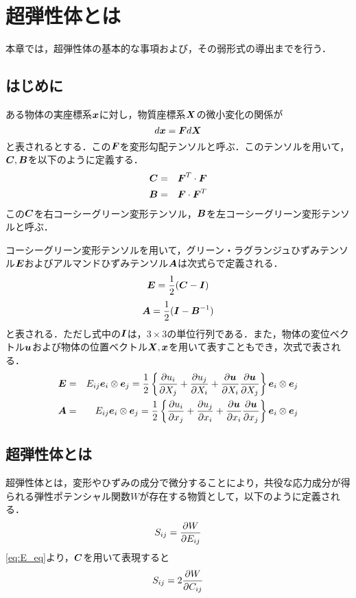 \section{超弾性体とは}
本章では，超弾性体の基本的な事項および，その弱形式の導出までを行う．
\subsection{はじめに}
ある物体の実座標系$ \bd{x} $に対し，物質座標系$ \bd{X} $の微小変化の関係が
\begin{equation}\label{eq:FloryTensor}
	d\bd{x} = \bd{F}d\bd{X}
\end{equation}
と表されるとする．この$ \bd{F} $を変形勾配テンソルと呼ぶ．このテンソルを用いて，$ \bd{C},\bd{B} $を以下のように定義する．
\begin{eqnarray}\label{eq:CandB_Define}
	\bd{C} &=& \bd{F}^T \cdot \bd{F} \\
	\bd{B} &=& \bd{F} \cdot \bd{F}^T
\end{eqnarray}
この$ \bd{C} $を右コーシーグリーン変形テンソル，$ \bd{B} $を左コーシーグリーン変形テンソルと呼ぶ．

コーシーグリーン変形テンソルを用いて，グリーン・ラグランジュひずみテンソル$ \bd{E} $およびアルマンドひずみテンソル$ \bd{A} $は次式らで定義される．
\begin{equation}\label{eq:E_eq}
	\bd{E}=\frac{1}{2} (\bd{C}-\bd{I})
\end{equation}
\begin{equation}\label{eq:Aeq}
	\bd{A} = \frac{1}{2} (\bd{I}-\bd{B}^{-1})
\end{equation}
と表される．ただし式中の$ \bd{I} $は，$ 3\times 3 $の単位行列である．また，物体の変位ベクトル$ \bd{u} $および物体の位置ベクトル$ \bd{X},\bd{x} $を用いて表すこともでき，次式で表される．
\begin{eqnarray}\label{eq:E_Deri}
	\bd{E} &=& E_{ij} \bd{e}_i \otimes \bd{e}_j = \frac{1}{2} \left\{ \partdf{u_i}{X_j} + \partdf{u_j}{X_i} + \partdf{\bd{u}}{X_i} \partdf{\bd{u}}{X_j} \right\} \bd{e}_i \otimes \bd{e}_j \\
	\bd{A} &=& E_{ij} \bd{e}_i \otimes \bd{e}_j = \frac{1}{2} \left\{ \partdf{u_i}{x_j} + \partdf{u_j}{x_i} + \partdf{\bd{u}}{x_i} \partdf{\bd{u}}{x_j} \right\} \bd{e}_i \otimes \bd{e}_j
\end{eqnarray}
\subsection{超弾性体とは}
超弾性体とは，変形やひずみの成分で微分することにより，共役な応力成分が得られる弾性ポテンシャル関数$ W $が存在する物質として，以下のように定義される．
\begin{equation}\label{eq:StrainEq}
	S_{ij} = \partdf{W}{E_{ij}}
\end{equation}
\eqref{eq:E_eq}より，$ \bd{C} $を用いて表現すると
\begin{equation}\label{eq:StrainEq2}
	S_{ij} = 2\partdf{W}{C_{ij}}
\end{equation}

